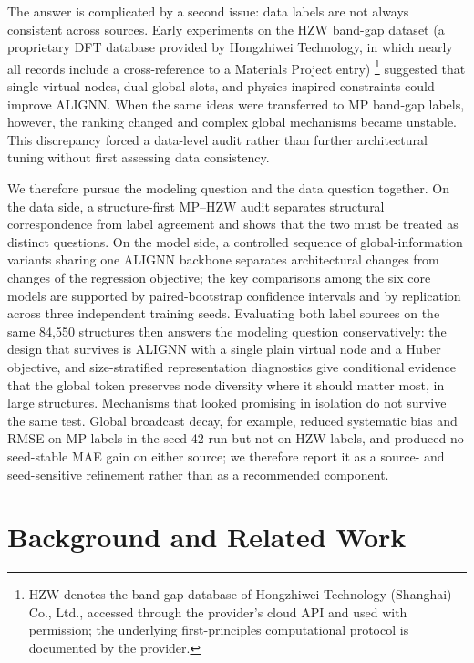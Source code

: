 \documentclass[a4paper,11pt]{article}
\begin{document}
The answer is complicated by a second issue: data labels are not always consistent across sources. Early experiments on the HZW band-gap dataset (a proprietary DFT database provided by Hongzhiwei Technology, in which nearly all records include a cross-reference to a Materials Project entry)%
\footnote{HZW denotes the band-gap database of Hongzhiwei Technology (Shanghai) Co., Ltd., accessed through the provider's cloud API and used with permission; the underlying first-principles computational protocol is documented by the provider.
} suggested that single virtual nodes, dual global slots, and physics-inspired constraints could improve ALIGNN. When the same ideas were transferred to MP band-gap labels, however, the ranking changed and complex global mechanisms became unstable. This discrepancy forced a data-level audit rather than further architectural tuning without first assessing data consistency.

We therefore pursue the modeling question and the data question together. On the data side, a structure-first MP--HZW audit separates structural correspondence from label agreement and shows that the two must be treated as distinct questions. On the model side, a controlled sequence of global-information variants sharing one ALIGNN backbone separates architectural changes from changes of the regression objective; the key comparisons among the six core models are supported by paired-bootstrap confidence intervals and by replication across three independent training seeds. Evaluating both label sources on the same 84,550 structures then answers the modeling question conservatively: the design that survives is ALIGNN with a single plain virtual node and a Huber objective, and size-stratified representation diagnostics give conditional evidence that the global token preserves node diversity where it should matter most, in large structures. Mechanisms that looked promising in isolation do not survive the same test. Global broadcast decay, for example, reduced systematic bias and RMSE on MP labels in the seed-42 run but not on HZW labels, and produced no seed-stable MAE gain on either source; we therefore report it as a source- and seed-sensitive refinement rather than as a recommended component.

\section{Background and Related Work}
\label{sec:related}
\end{document}
